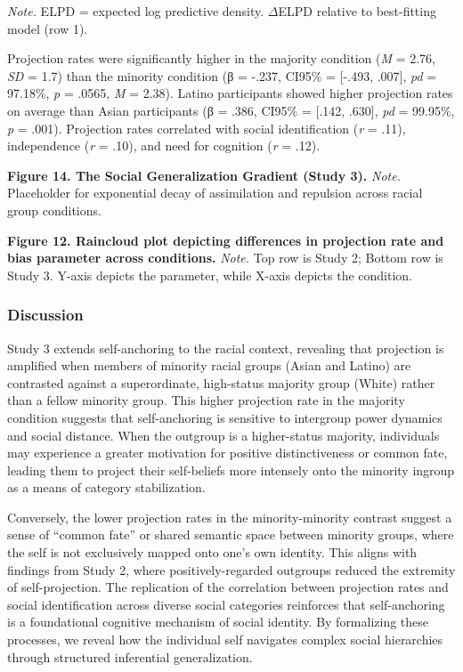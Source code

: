 \documentclass[
  man,
  longtable,
  nolmodern,
  notxfonts,
  notimes,
  man]{apa7}
\begin{document}
\emph{Note.} ELPD = expected log predictive density. \(\Delta\)ELPD
relative to best-fitting model (row 1).

Projection rates were significantly higher in the majority condition
(\emph{M} = 2.76, \emph{SD} = 1.7) than the minority condition (β =
-.237, CI95\% = {[}-.493, .007{]}, \emph{pd} = 97.18\%, \emph{p} =
.0565, \emph{M} = 2.38). Latino participants showed higher projection
rates on average than Asian participants (β = .386, CI95\% = {[}.142,
.630{]}, \emph{pd} = 99.95\%, \emph{p} = .001). Projection rates
correlated with social identification (\emph{r} = .11), independence
(\emph{r} = .10), and need for cognition (\emph{r} = .12).

\textbf{Figure 14. The Social Generalization Gradient (Study 3).}
\emph{Note.} Placeholder for exponential decay of assimilation and
repulsion across racial group conditions.

\textbf{Figure 12. Raincloud plot depicting differences in projection
rate and bias parameter across conditions.} \emph{Note.} Top row is
Study 2; Bottom row is Study 3. Y-axis depicts the parameter, while
X-axis depicts the condition.

\subsubsection{Discussion}\label{discussion-2}

Study 3 extends self-anchoring to the racial context, revealing that
projection is amplified when members of minority racial groups (Asian
and Latino) are contrasted against a superordinate, high-status majority
group (White) rather than a fellow minority group. This higher
projection rate in the majority condition suggests that self-anchoring
is sensitive to intergroup power dynamics and social distance. When the
outgroup is a higher-status majority, individuals may experience a
greater motivation for positive distinctiveness or common fate, leading
them to project their self-beliefs more intensely onto the minority
ingroup as a means of category stabilization.

Conversely, the lower projection rates in the minority-minority contrast
suggest a sense of ``common fate'' or shared semantic space between
minority groups, where the self is not exclusively mapped onto one's own
identity. This aligns with findings from Study 2, where
positively-regarded outgroups reduced the extremity of self-projection.
The replication of the correlation between projection rates and social
identification across diverse social categories reinforces that
self-anchoring is a foundational cognitive mechanism of social identity.
By formalizing these processes, we reveal how the individual self
navigates complex social hierarchies through structured inferential
generalization.
\end{document}
